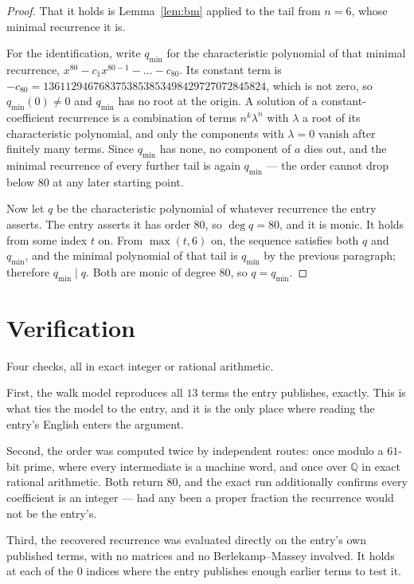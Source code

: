 \documentclass[11pt,a4paper]{article}
\theoremstyle{plain}
\theoremstyle{definition}
\begin{document}
\begin{proof}
That it holds is Lemma~\ref{lem:bm} applied to the tail from $n=6$, whose minimal
recurrence it is.

For the identification, write $q_{\min}$ for the characteristic polynomial of that minimal
recurrence, $x^{80}-c_1x^{80-1}-\dots-c_{80}$. Its constant term is
$-c_{80}=1361129467683753853853498429727072845824$, which is not zero, so $q_{\min}(0)\neq0$ and $q_{\min}$ has no
root at the origin. A solution of a constant-coefficient recurrence is a combination of terms
$n^{k}\lambda^{n}$ with $\lambda$ a root of its characteristic polynomial, and only the
components with $\lambda=0$ vanish after finitely many terms. Since $q_{\min}$ has none, no
component of $a$ dies out, and the minimal recurrence of every further tail is again
$q_{\min}$ --- the order cannot drop below $80$ at any later starting point.

Now let $q$ be the characteristic polynomial of whatever recurrence the entry asserts. The
entry asserts it has order $80$, so $\deg q=80$, and it is monic. It holds from some
index $t$ on. From $\max(t,6)$ on, the sequence satisfies both $q$ and $q_{\min}$, and
the minimal polynomial of that tail is $q_{\min}$ by the previous paragraph; therefore
$q_{\min}\mid q$. Both are monic of degree $80$, so $q=q_{\min}$.
\end{proof}

\section{Verification}

Four checks, all in exact integer or rational arithmetic.

First, the walk model reproduces all $13$ terms the entry publishes, exactly. This is
what ties the model to the entry, and it is the only place where reading the entry's English
enters the argument.

Second, the order was computed twice by independent routes: once modulo a $61$-bit prime, where
every intermediate is a machine word, and once over $\mathbb{Q}$ in exact rational arithmetic.
Both return $80$, and the exact run additionally confirms every coefficient is an integer
--- had any been a proper fraction the recurrence would not be the entry's.

Third, the recovered recurrence was evaluated directly on the entry's own published terms, with
no matrices and no Berlekamp--Massey involved. It holds at each of the $0$ indices where
the entry publishes enough earlier terms to test it.
\end{document}
